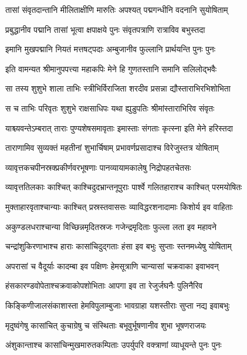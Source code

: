 \twolineshloka
{तासां संवृतदान्तानि मीलिताक्षीणि मारुतिः}
{अपश्यत् पद्मगन्धीनि वदनानि सुयोषिताम्} %

\twolineshloka
{प्रबुद्धानीव पद्मानि तासां भूत्वा क्षपाक्षये}
{पुनः संवृतपत्राणि रात्राविव बभुस्तदा} %

\twolineshloka
{इमानि मुखपद्मानि नियतं मत्तषट्पदाः}
{अम्बुजानीव फुल्लानि प्रार्थयन्ति पुनः पुनः} %

\twolineshloka
{इति वामन्यत श्रीमानुपपत्त्या महाकपिः}
{मेने हि गुणतस्तानि समानि सलिलोद्भवैः} %

\twolineshloka
{सा तस्य शुशुभे शाला ताभिः स्त्रीभिर्विराजिता}
{शरदीव प्रसन्ना द्यौस्ताराभिरभिशोभिता} %

\twolineshloka
{स च ताभिः परिवृतः शुशुभे राक्षसाधिपः}
{यथा ह्युडुपतिः श्रीमांस्ताराभिरिव संवृतः} %

\twolineshloka
{याश्च्यवन्तेऽम्बरात् ताराः पुण्यशेषसमावृताः}
{इमास्ताः संगताः कृत्स्ना इति मेने हरिस्तदा} %

\twolineshloka
{ताराणामिव सुव्यक्तं महतीनां शुभार्चिषाम्}
{प्रभावर्णप्रसादाश्च विरेजुस्तत्र योषिताम्} %

\twolineshloka
{व्यावृत्तकचपीनस्रक्प्रकीर्णवरभूषणाः}
{पानव्यायामकालेषु निद्रोपहतचेतसः} %

\twolineshloka
{व्यावृत्ततिलकाः काश्चित् काश्चिदुदभ्रान्तनूपुराः}
{पार्श्वे गलितहाराश्च काश्चित् परमयोषितः} %

\twolineshloka
{मुक्ताहारवृताश्चान्याः काश्चित् प्रस्रस्तवाससः}
{व्याविद्धरशनादामाः किशोर्य इव वाहिताः} %

\twolineshloka
{अकुण्डलधराश्चान्या विच्छिन्नमृदितस्रजः}
{गजेन्द्रमृदिताः फुल्ला लता इव महावने} %

\twolineshloka
{चन्द्रांशुकिरणाभाश्च हाराः कासांचिदुद्गताः}
{हंसा इव बभुः सुप्ताः स्तनमध्येषु योषिताम्} %

\twolineshloka
{अपरासां च वैदूर्याः कादम्बा इव पक्षिणः}
{हेमसूत्राणि चान्यासां चक्रवाका इवाभवन्} %

\twolineshloka
{हंसकारण्डवोपेताश्चक्रवाकोपशोभिताः}
{आपगा इव ता रेजुर्जघनैः पुलिनैरिव} %

\twolineshloka
{किङ्किणीजालसंकाशास्ता हेमविपुलाम्बुजाः}
{भावग्राहा यशस्तीराः सुप्ता नद्य इवाबभुः} %

\twolineshloka
{मृदुष्वंगेषु कासांचित् कुचाग्रेषु च संस्थिताः}
{बभूवुर्भूषणानीव शुभा भूषणराजयः} %

\twolineshloka
{अंशुकान्ताश्च कासांचिन्मुखमारुतकम्पिताः}
{उपर्युपरि वक्त्राणां व्याधूयन्ते पुनः पुनः} %

